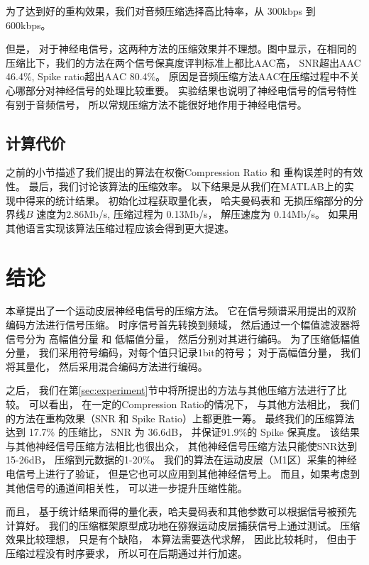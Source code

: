 为了达到好的重构效果，我们对音频压缩选择高比特率，从 300kbps 到 600kbps。 

但是， 对于神经电信号，这两种方法的压缩效果并不理想。图中显示，在相同的压缩比下，我们的方法在两个信号保真度评判标准上都比AAC高， SNR超出AAC 46.4\%, Spike ratio超出AAC 80.4\%。 原因是音频压缩方法AAC在压缩过程中不关心哪部分对神经信号的处理比较重要。 实验结果也说明了神经电信号的信号特性有别于音频信号， 所以常规压缩方法不能很好地作用于神经电信号。 





\subsection{计算代价}
之前的小节描述了我们提出的算法在权衡Compression Ratio 和 重构误差时的有效性。 最后，我们讨论该算法的压缩效率。 以下结果是从我们在MATLAB上的实现中得来的统计结果。 初始化过程获取量化表， 哈夫曼码表和 无损压缩部分的分界线$B$ 速度为2.86Mb/s, 压缩过程为 0.13Mb/s， 解压速度为 0.14Mb/s。 如果用其他语言实现该算法压缩过程应该会得到更大提速。 




\section{结论}
本章提出了一个运动皮层神经电信号的压缩方法。 它在信号频谱采用提出的双阶编码方法进行信号压缩。 时序信号首先转换到频域， 然后通过一个幅值滤波器将信号分为 高幅值分量 和 低幅值分量， 然后分别对其进行编码。 为了压缩低幅值分量， 我们采用符号编码，对每个值只记录1bit的符号； 对于高幅值分量， 我们将其量化， 然后采用混合编码方法进行编码。 

之后， 我们在第\ref{sec:experiment}节中将所提出的方法与其他压缩方法进行了比较。 可以看出， 在一定的Compression Ratio的情况下， 与其他方法相比， 我们的方法在重构效果（SNR 和 Spike Ratio）上都更胜一筹。 最终我们的压缩算法达到 17.7\% 的压缩比， SNR 为 36.6dB， 并保证91.9\%的 Spike 保真度。 该结果与其他神经信号压缩方法相比也很出众， 其他神经信号压缩方法只能使SNR达到 15-26dB， 压缩到元数据的1-20\%\cite{15,16,25}。 我们的算法在运动皮层（M1区）采集的神经电信号上进行了验证， 但是它也可以应用到其他神经信号上。 而且，如果考虑到其他信号的通道间相关性， 可以进一步提升压缩性能。 

而且， 基于统计结果而得的量化表，哈夫曼码表和其他参数可以根据信号被预先计算好。 我们的压缩框架原型成功地在猕猴运动皮层捕获信号上通过测试。 压缩效果比较理想， 只是有个缺陷， 本算法需要迭代求解， 因此比较耗时， 但由于压缩过程没有时序要求， 所以可在后期通过并行加速。












